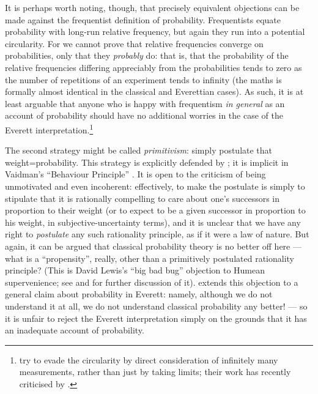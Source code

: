 \documentclass[12pt]{article}
\begin{document}
It is perhaps worth noting, though, that precisely equivalent objections can be made against the frequentist definition of probability. Frequentists equate probability with long-run relative frequency, but again they run into a potential circularity. For we cannot prove that relative frequencies converge on probabilities, only that they \emph{probably} do: that is, that the probability of the relative frequencies differing appreciably from the probabilities tends to zero as the number of repetitions of an experiment tends to infinity (the maths is formally almost identical in the classical and Everettian cases). As such, it is at least arguable that anyone who is happy with frequentism \emph{in general} as an account of probability should have no additional worries in the case of the Everett interpretation.\footnote{ try to evade the circularity by direct consideration of infinitely many measurements, rather than just by taking limits; their work has recently criticised by . } 

The second strategy might be called \emph{primitivism}: simply postulate that weight=probability. This strategy is explicitly defended by ; it is implicit in Vaidman's ``Behaviour Principle'' \cite{vaidmanencyclopedia}. It is open to the criticism of being unmotivated and even incoherent: effectively, to make the postulate is simply to stipulate that it is rationally compelling to care about one's successors in proportion to their weight (or to expect to be a given successor in proportion to his weight, in subjective-uncertainty terms), and it is unclear that we have any right to \emph{postulate} any such rationality principle, as if it were a law of nature. But again, it can be argued that classical probability theory is no better off here --- what is a ``propensity'', really, other than a primitively postulated rationality principle? (This is David Lewis's ``big bad bug'' objection to Humean supervenience; see  and  for further discussion of it).  extends this objection to a general claim about probability in Everett: namely, although we do not understand it at all, we do not understand classical probability any better! --- so it is unfair to reject the Everett interpretation simply on the grounds that it has an inadequate account of probability.
\end{document}
